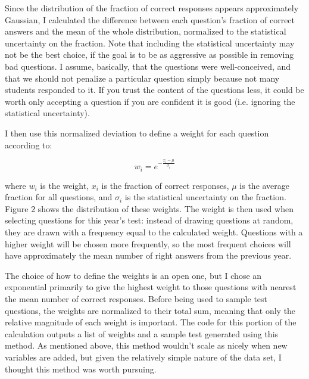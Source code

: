 \documentclass[twoside,11pt, letter]{article}
\newcommand{\1}[1]{\, \mathrm{#1}} %
\begin{document}
Since the distribution of the fraction of correct responses appears approximately Gaussian, I calculated the difference between each question's fraction of correct answers and the mean of the whole distribution, normalized to the statistical uncertainty on the fraction.
Note that including the statistical uncertainty may not be the best choice, if the goal is to be as aggressive as possible in removing bad questions.
I assume, basically, that the questions were well-conceived, and that we should not penalize a particular question simply because not many students responded to it.
If you trust the content of the questions less, it could be worth only accepting a question if you are confident it is good (i.e. ignoring the statistical uncertainty).

I then use this normalized deviation to define a weight for each question according to:

\begin{equation*}
\displaystyle w_i = e^{-\frac{x_i - \mu}{\sigma_i}}
\end{equation*}

\noindent where $w_i$ is the weight, $x_i$ is the fraction of correct responses, $\mu$ is the average fraction for all questions, and $\sigma_i$ is the statistical uncertainty on the fraction.
Figure 2 shows the distribution of these weights.
The weight is then used when selecting questions for this year's test: instead of drawing questions at random, they are drawn with a frequency equal to the calculated weight.
Questions with a higher weight will be chosen more frequently, so the most frequent choices will have approximately the mean number of right answers from the previous year.

The choice of how to define the weights is an open one, but I chose an exponential primarily to give the highest weight to those questions with nearest the mean number of correct responses.
Before being used to sample test questions, the weights are normalized to their total sum, meaning that only the relative magnitude of each weight is important.
The code for this portion of the calculation outputs a list of weights and a sample test generated using this method.
As mentioned above, this method wouldn't scale as nicely when new variables are added, but given the relatively simple nature of the data set, I thought this method was worth pursuing.
\end{document}

